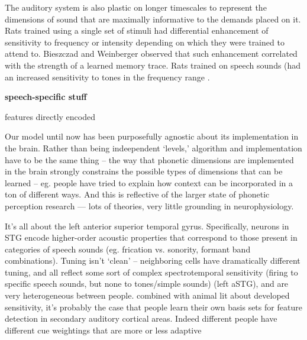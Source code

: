 The auditory system is also plastic on longer timescales to represent the dimensions of sound that are maximally informative to the demands placed on it. Rats trained using a single set of stimuli had differential enhancement of sensitivity to frequency or intensity depending on which they were trained to attend to\cite{Polley2006}. Bieszczad and Weinberger observed that such enhancement correlated with the strength of a learned memory trace\cite{bieszczadRepresentationalGainCortical2010}. Rats trained on speech sounds (had an increased sensitivity to tones in the frequency range \cite{engineerSpeechTrainingAlters2015a}.




\textbf{speech-specific stuff}

features directly encoded\cite{changCategoricalSpeechRepresentation2010b,mesgaraniPhoneticFeatureEncoding2014,belinVoiceselectiveAreasHuman2000b,Pasley2012}



Our model until now has been purposefully agnostic about its implementation in the brain. Rather than being indeependent `levels,' algorithm and implementation have to be the same thing -- the way that phonetic dimensions are implemented in the brain strongly constrains the possible types of dimensions that can be learned -- eg. people have tried to explain how context can be incorporated in a ton of different ways. And this is reflective of the larger state of phonetic perception research --- lots of theories, very little grounding in neurophysiology.

It's all about the left anterior superior temporal gyrus\cite{yiEncodingSpeechSounds2019}. Specifically, neurons in STG encode higher-order acoustic properties that correspond to those present in categories of speech sounds (eg. frication vs. sonority, formant band combinations). Tuning isn't `clean' -- neighboring cells have dramatically different tuning, and all reflect some sort of complex spectrotemporal sensitivity (firing to specific speech sounds, but none to tones/simple sounds) (left aSTG)\cite{chanSpeechSpecificTuningNeurons2014}, and are very heterogeneous between people. combined with animal lit about developed sensitivity, it's probably the case that people learn their own basis sets for feature detection in secondary auditory cortical areas. Indeed different people have different cue weightings that are more or less adaptive\cite{clayardsDifferencesCueWeights2018}

